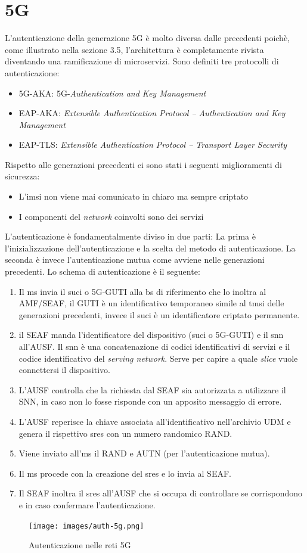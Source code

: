 \clearpage

\section{5G}
L'autenticazione della generazione 5G è molto diversa dalle precedenti poichè, come illustrato nella sezione 3.5, l'architettura è completamente rivista diventando una ramificazione di microservizi.
Sono definiti tre protocolli di autenticazione:
\begin{itemize}
    \item 5G-AKA: 5G-\textit{Authentication and Key Management}
    \item EAP-AKA: \textit{Extensible Authentication Protocol – Authentication and Key Management}
    \item EAP-TLS: \textit{Extensible Authentication Protocol – Transport Layer Security}
\end{itemize}
Rispetto alle generazioni precedenti ci sono stati i seguenti miglioramenti di sicurezza\cite{5g-vs-4g}:
\begin{itemize}
    \item L'\gls{imsi} non viene mai comunicato in chiaro ma sempre criptato
    \item I componenti del \textit{network} coinvolti sono dei servizi
\end{itemize}
L'autenticazione è fondamentalmente diviso in due parti: La prima è l'inizializzazione dell'autenticazione e la scelta del metodo di autenticazione.
La seconda è invece l'autenticazione mutua come avviene nelle generazioni precedenti.
Lo schema di autenticazione è il seguente\cite{5g-auth}:
\begin{enumerate}
    \item Il \gls{ms} invia il \gls{suci} o 5G-GUTI alla \gls{bs} di riferimento che lo inoltra al AMF/SEAF,
    il GUTI è un identificativo temporaneo simile al \gls{tmsi} delle generazioni precedenti, invece il \gls{suci} è un identificatore criptato
    permanente.
    \item il SEAF manda l'identificatore del dispositivo (\gls{suci} o 5G-GUTI) e il \gls{snn} all'AUSF.
    Il \gls{snn} è una concatenazione di codici identificativi di servizi e il codice identificativo del \textit{serving network}. Serve per capire 
    a quale \textit{slice} vuole connettersi il dispositivo.
    \item L'AUSF controlla che la richiesta dal SEAF sia autorizzata a utilizzare il SNN, in caso non lo fosse risponde con un 
    apposito messaggio di errore.
    \item L'AUSF reperisce la chiave associata all'identificativo nell'archivio UDM e genera il rispettivo \gls{sres} con un numero randomico RAND.
    \item Viene inviato all'\gls{ms} il RAND e AUTN (per l'autenticazione mutua).
    \item Il \gls{ms} procede con la creazione del \gls{sres} e lo invia al SEAF.
    \item Il SEAF inoltra il \gls{sres} all'AUSF che si occupa di controllare se corrispondono e in caso confermare l'autenticazione.
\end{enumerate}
\begin{figure}[h]
    \centering
    \texttt{[image: images/auth-5g.png]}
    \caption{Autenticazione nelle reti 5G}
\end{figure}
